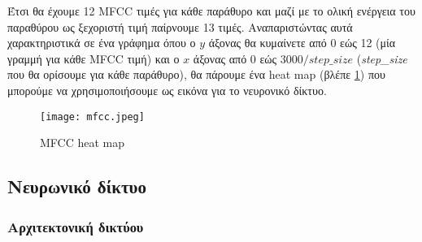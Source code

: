 Έτσι θα έχουμε 12 MFCC τιμές για κάθε παράθυρο και μαζί με το ολική ενέργεια
του παραθύρου ως ξεχοριστή τιμή παίρνουμε 13 τιμές. Αναπαριστώντας αυτά
χαρακτηριστικά σε ένα γράφημα όπου ο $y$ άξονας θα κυμαίνετε από 0 εώς 12 (μία
γραμμή για κάθε MFCC τιμή) και ο $x$ άξονας από 0 εώς $3000 / step\_size$
(\emph{step\_size} που θα ορίσουμε για κάθε παράθυρο), θα πάρουμε ένα heat map
(βλέπε \ref{mfcc}) που μπορούμε να χρησιμοποιήσουμε ως εικόνα για το νευρονικό
δίκτυο.

\begin{figure}[H]
  \center
	\texttt{[image: mfcc.jpeg]}
  \caption{MFCC heat map \cite{fayek2016}}
	\label{mfcc}
\end{figure}

\subsection{Νευρωνικό δίκτυο}
\subsubsection{Αρχιτεκτονική δικτύου}
